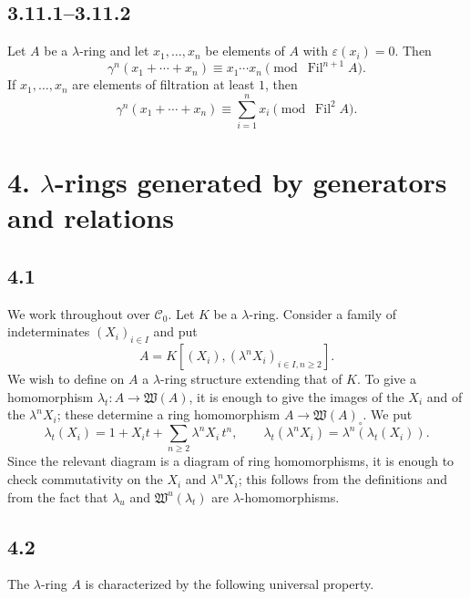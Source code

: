 \documentclass[11pt]{article}
\theoremstyle{plain}
\theoremstyle{definition}
\theoremstyle{remark}
\providecommand{\Fil}{\operatorname{Fil}}
\begin{document}
\subsection*{3.11.1--3.11.2}
Let $A$ be a $\lambda$-ring and let $x_1,\ldots,x_n$ be elements of $A$ with $\varepsilon(x_i)=0$. Then
\begin{equation}\label{eq:3.11.1}
\gamma^n(x_1+\cdots+x_n)\equiv x_1\cdots x_n\pmod{\Fil^{n+1}A}.
\end{equation}
If $x_1,\ldots,x_n$ are elements of filtration at least $1$, then
\begin{equation}\label{eq:3.11.2}
\gamma^n(x_1+\cdots+x_n)\equiv \sum_{i=1}^{n}x_i\pmod{\Fil^2A}.
\end{equation}

\section*{4. $\lambda$-rings generated by generators and relations}

\subsection*{4.1}
We work throughout over $\mathcal C_0$. Let $K$ be a $\lambda$-ring. Consider a family of indeterminates $(X_i)_{i\in I}$ and put
\[
A=K[(X_i), (\lambda^nX_i)_{i\in I,n\geq 2}].
\]
We wish to define on $A$ a $\lambda$-ring structure extending that of $K$. To give a homomorphism $\lambda_t:A\to\mathfrak W(A)$, it is enough to give the images of the $X_i$ and of the $\lambda^nX_i$; these determine a ring homomorphism $A\to\mathfrak W(A)_\circ$. We put
\begin{equation}\label{eq:4.1.1}
\lambda_t(X_i)=1+X_it+\sum_{n\geq 2}\lambda^nX_i\,t^n,
\qquad
\lambda_t(\lambda^nX_i)=\lambda^n(\lambda_t(X_i)).
\end{equation}
Since the relevant diagram is a diagram of ring homomorphisms, it is enough to check commutativity on the $X_i$ and $\lambda^nX_i$; this follows from the definitions and from the fact that $\lambda_u$ and $\mathfrak W^u(\lambda_t)$ are $\lambda$-homomorphisms.

\subsection*{4.2}
The $\lambda$-ring $A$ is characterized by the following universal property.
\end{document}
